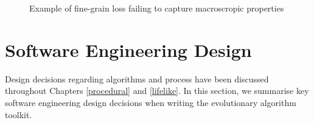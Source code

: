 \begin{figure}[!h]
\centering
            \hfill
            \hfill
            \hfill
            \caption{Example of fine-grain loss failing to capture macroscropic properties}
\label{fig:singleres-fail}
\end{figure}

\section{Software Engineering Design} \label{sec:sed}

Design decisions regarding algorithms and process have been discussed throughout Chapters \ref{procedural} and \ref{lifelike}. In this section, we summarise key software engineering design decisions when writing the evolutionary algorithm toolkit.\\

